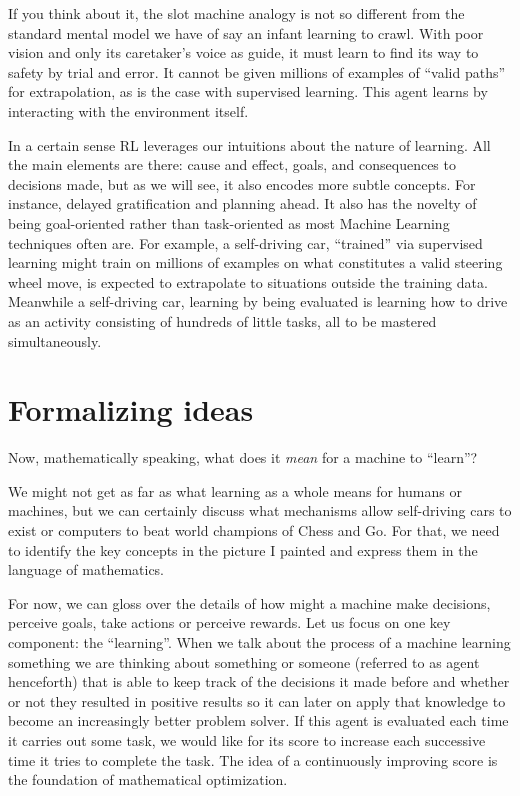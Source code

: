 If you think about it, the slot machine analogy is not so 
different from the standard mental model we have of say an 
infant learning to crawl.  With poor vision and only its 
caretaker's voice as guide, it must learn to find its way to 
safety by trial and error. It cannot be given millions of 
examples of ``valid paths'' for extrapolation, as is the case 
with supervised learning. This agent learns by interacting with 
the environment itself.

In a certain sense RL leverages our intuitions about the nature 
of learning. All the main elements are there: cause and effect, 
goals, and consequences to decisions made, but as we will see, 
it also encodes more subtle concepts. For instance, delayed 
gratification and planning ahead. It also has the novelty of 
being goal-oriented rather than task-oriented as most Machine 
Learning techniques often are. For example, a self-driving car, 
``trained'' via supervised learning might train on millions of 
examples on what constitutes a valid steering wheel move, is
expected to extrapolate to situations outside the training 
data. Meanwhile a self-driving car, learning by being evaluated 
is learning how to drive as an activity consisting of hundreds 
of little tasks, all to be mastered simultaneously.

\section{Formalizing ideas}
Now, mathematically speaking, what does it \textit{mean} for a 
machine to ``learn''?

We might not get as far as what learning as a whole means for 
humans or machines, but we can certainly discuss what 
mechanisms allow self-driving cars to exist or computers to 
beat world champions of Chess and Go. For that, we need to 
identify the key concepts in the picture I painted and express 
them in the language of mathematics.

For now, we can gloss over the details of how might a machine 
make decisions, perceive goals, take actions or perceive 
rewards. Let us focus on one key component: the ``learning''. 
When we talk about the process of a machine learning something 
we are thinking about something or someone (referred to as 
agent henceforth) that is able to keep track of the decisions 
it made before and whether or not they resulted in positive 
results so it can later on apply that knowledge to become an 
increasingly better problem solver. If this agent is evaluated 
each time it carries out some task, we would like for its score 
to increase each successive time it tries to complete the task. 
The idea of a continuously improving score is the foundation of 
mathematical optimization.

